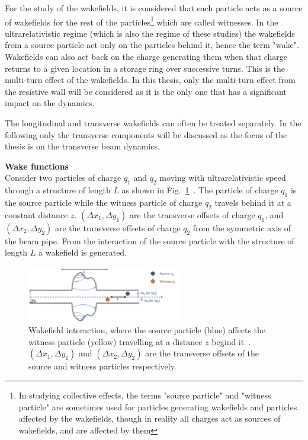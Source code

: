 For the study of the wakefields, it is considered that each particle acts as a source of wakefields for the rest of the particles\footnote{In studying collective effects, the terms "source particle" and "witness particle" are sometimes used for particles generating wakefields and particles affected by the wakefields, though in reality all charges act as sources of wakefields, and are affected by them} which are called witnesses. In the ultrarelativistic regime (which is also the regime of these studies) the wakefields from a source particle act only on the particles behind it, hence the term "wake". Wakefields can also act back on the charge generating them when that charge returns to a given location in a storage ring over successive turns. This is the multi-turn effect of the wakefields. In this thesis, only the multi-turn effect from the resistive wall will be considered as it is the only one that has a significant impact on the dynamics.

The longitudinal and transverse wakefields can often be treated separately. In the following only the transverse components will be discussed as the focus of the thesis is on the transverse beam dynamics.

\textbf{Wake functions}\\
Consider two particles of charge $q_1$ and $q_2$ moving with ultrarelativistic speed through a structure of length $L$ as shown in Fig.~\ref{fig:wakefields}~\cite{instabilities_rumulo_li}. The particle of charge $q_1$ is the source particle while the witness particle of charge $q_2$ travels behind it at a constant distance $z$. $(\Delta x_1, \Delta y_1)$ are the transverse offsets of charge $q_1$, and $(\Delta x_2, \Delta y_2)$ are the transverse offsets of charge $q_2$ from the symmetric axis of the beam pipe. From the interaction of the source particle with the structure of length $L$ a wakefield is generated. 

\begin{figure}[!h] %
    \centering         
    \includegraphics[width=0.6\textwidth]{images/Ch2/wakefield_example.png}
        \caption{Wakefield interaction, where the source particle (blue) affects the witness particle (yellow) travelling at a distance $z$ begind it~\cite{instabilities_rumulo_li}. $(\Delta x_1, \Delta y_1)$ and $ (\Delta x_2, \Delta y_2)$ are the transverse offsets of the source and witness particles respectively.} 
        \label{fig:wakefields}
 \end{figure}

